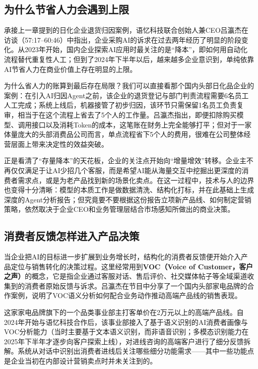 \documentclass[UTF8,a4paper,11pt,fontset=fandol]{ctexart}
\begin{document}
\subsection{为什么节省人力会遇到上限}
承接上一章提到的日化企业退货归因案例，语忆科技联合创始人兼CEO吕瀛杰在访谈（57:17–60:46）中指出，企业采购AI的诉求在过去两年经历了明显的阶段变化。从2023年开始，国内企业探索AI应用时最关注的是“降本”，即如何用自动化流程替代重复性人工；但到了2024年下半年以后，越来越多企业意识到，单纯依靠AI节省人力在商业价值上存在明显的上限。

为什么省人力的账算到最后存在局限？我们可以直接看那个国内头部日化品企业的案例：在引入AI归因Agent之前，该企业的退货登记与部门判责流程需要6名员工人工完成；系统上线后，机器接管了初步归因，该环节只需保留1名员工负责复审，相当于在这个流程上省去了5个人的工作量。吕瀛杰指出，即便扣除购买模型、调用接口以及消耗Token的成本，这笔账在财务上完全能够打平；但对于一家体量庞大的头部消费品公司而言，单点流程省下5个人的费用，很难在公司整体经营层面上带来决定性的效益突破。

正是看清了“存量降本”的天花板，企业的关注点开始向“增量增效”转移。企业主不再仅仅满足于让AI少招几个客服，而是希望AI能从海量交互中挖掘出更深度的消费者需求点，或是为老产品找到新的场景化卖点。在这一过程中，技术与人的边界也变得十分清晰：模型的本质工作是做数据清洗、结构化打标，并在此基础上生成深度的Agent分析报告；但究竟要不要根据这份报告立项新产品线、如何制定营销策略，依然取决于企业CEO和业务管理层结合市场感知所做出的商业决策。

\subsection{消费者反馈怎样进入产品决策}
当企业把AI的目标进一步扩展到业务增长时，结构化的消费者反馈便开始介入产品定位与销售转化的决策过程。这里经常用到\textbf{VOC（Voice of Customer，客户之声）}的概念，它是指企业通过客服对话、售后评价、社交媒体帖子等全域渠道收集到的消费者原始反馈与诉求。吕瀛杰在节目中分享了一个国内头部家电品牌的合作案例，说明了VOC语义分析如何配合业务动作推动高端产品线的销售表现。

这家家电品牌旗下的一个品类事业部主打客单价在2万元以上的高端产品线。自2024年开始与语忆科技合作后，该事业部接入了基于语义识别的AI消费者画像与VOC分析能力（当时主要基于文本语义识别，而非语音识别；多模态识别能力在2025年下半年才逐步向客户探索上线），对进线咨询的高端客户进行了细分反馈拆解。系统从对话中识别出消费者进线后关注哪些细分功能需求——其中一些功能点是企业当初在内部设计营销卖点时并未关注到的。
\end{document}

